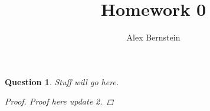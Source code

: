 \documentclass[10pt,letterpaper]{article}
\author{Alex Bernstein}
\title{Homework 0}
\newtheorem{problems}{Question}
\begin{document}
\begin{problems}
Stuff will go here.
\begin{proof}
Proof here update 2.
\end{proof}
\end{problems}
\end{document}
